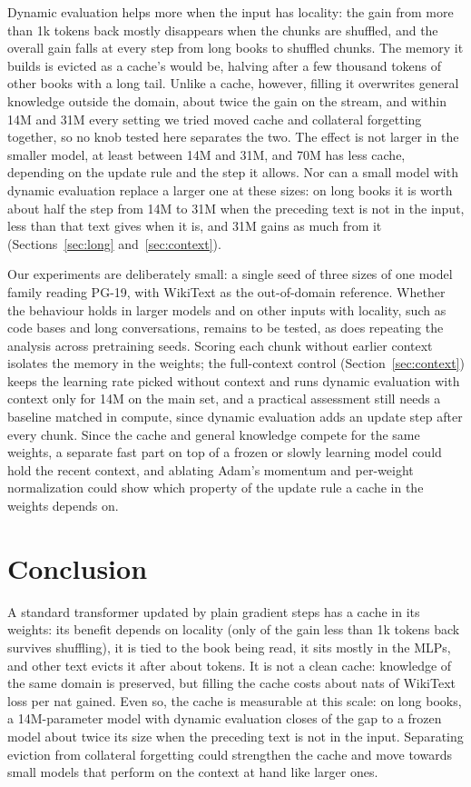 \documentclass[times,twocolumn,final,authoryear]{elsarticle}
\begin{document}
Dynamic evaluation helps more when the input has locality: the gain from more than 1k tokens back mostly disappears when the chunks are shuffled, and the overall gain falls at every step from long books to shuffled chunks.
The memory it builds is evicted as a cache's would be, halving after a few thousand tokens of other books with a long tail.
Unlike a cache, however, filling it overwrites general knowledge outside the domain, about twice the gain on the stream, and within 14M and 31M every setting we tried moved cache and collateral forgetting together, so no knob tested here separates the two.
The effect is not larger in the smaller model, at least between 14M and 31M, and 70M has less cache, depending on the update rule and the step it allows.
Nor can a small model with dynamic evaluation replace a larger one at these sizes: on long books it is worth about half the step from 14M to 31M when the preceding text is not in the input, less than that text gives when it is, and 31M gains as much from it (Sections~\ref{sec:long} and~\ref{sec:context}).

Our experiments are deliberately small: a single seed of three sizes of one model family reading PG-19, with WikiText as the out-of-domain reference.
Whether the behaviour holds in larger models and on other inputs with locality, such as code bases and long conversations, remains to be tested, as does repeating the analysis across pretraining seeds.
Scoring each chunk without earlier context isolates the memory in the weights; the full-context control (Section~\ref{sec:context}) keeps the learning rate picked without context and runs dynamic evaluation with context only for 14M on the main set, and a practical assessment still needs a baseline matched in compute, since dynamic evaluation adds an update step after every chunk.
Since the cache and general knowledge compete for the same weights, a separate fast part on top of a frozen or slowly learning model could hold the recent context, and ablating Adam's momentum and per-weight normalization could show which property of the update rule a cache in the weights depends on.

\section{Conclusion}

A standard transformer updated by plain gradient steps has a cache in its weights: its benefit depends on locality (only \shuffledShareOneK{} of the gain less than 1k tokens back survives shuffling), it is tied to the book being read, it sits mostly in the MLPs, and other text evicts it after about \evictHalfLife{} tokens.
It is not a clean cache: knowledge of the same domain is preserved, but filling the cache costs about \wikiOverGainKOne{} nats of WikiText loss per nat gained.
Even so, the cache is measurable at this scale: on long books, a 14M-parameter model with dynamic evaluation closes \gapClosedFourteen{} of the gap to a frozen model about twice its size when the preceding text is not in the input.
Separating eviction from collateral forgetting could strengthen the cache and move towards small models that perform on the context at hand like larger ones.
\end{document}
